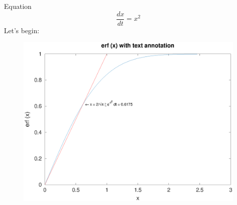\documentclass[12pt]{article}
\begin{document}
Equation
$$
\frac{dx}{dt}=x^2
$$
Let's begin:
\begin{figure}[htbp]
    \begin{center}
        \includegraphics[width=120mm]{octave-fig/fig.eps}
    \end{center}
\end{figure}
\end{document}
